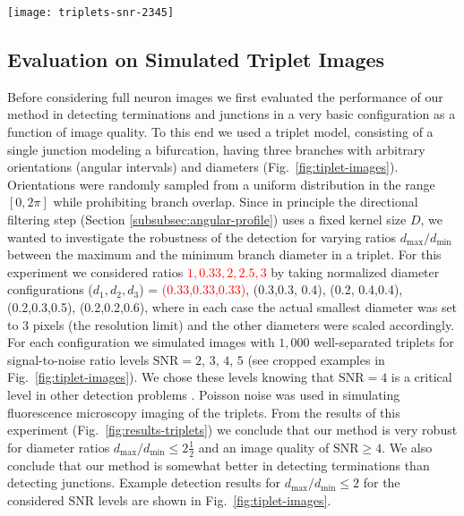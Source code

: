 \documentclass[twocolumn,natbib]{svjour3}
\newcommand{\marked}[1]{\textcolor{red}{#1}}
\begin{document}
\begin{figure*}[!t]
\centering
\texttt{[image: triplets-snr-2345]}
\caption{Examples of simulated triplet images and detection results. Each triplet consists of three branches with different diameters which join at one end to form a bifurcation point and with the other ends being termination points. Images were generated at $\textrm{SNR}=2,3,4,5$ (left to right panel). The detection results with our method are indicated as red circles (bifurcation points) and yellow circles (termination points), where the radius of each circle reflects the size of the critical region found by our method.} %
\label{fig:tiplet-images}
\end{figure*}

\subsection{Evaluation on Simulated Triplet Images}
\label{subsec:experiments-triplets}
Before considering full neuron images we first evaluated the performance of our method in detecting terminations and junctions in a very basic configuration as a function of image quality. To this end we used a triplet model, consisting of a single junction modeling a bifurcation, having three branches with arbitrary orientations (angular intervals) and diameters (Fig.~\ref{fig:tiplet-images}). Orientations were randomly sampled from a uniform distribution in the range $[0,2\pi]$ while prohibiting branch overlap. Since in principle the directional filtering step (Section \ref{subsubsec:angular-profile}) uses a fixed kernel size $D$, we wanted to investigate the robustness of the detection for varying ratios $d_{\max}/d_{\min}$ between the maximum and the minimum branch diameter in a triplet. For this experiment we considered ratios \marked{$1,0.33,2,2.5,3$} by taking normalized diameter configurations ($d_1,d_2,d_3$) = \marked{(0.33,0.33,0.33)}, (0.3,0.3, 0.4), (0.2, 0.4,0.4), (0.2,0.3,0.5), (0.2,0.2,0.6), where in each case the actual smallest diameter was set to 3 pixels (the resolution limit) and the other diameters were scaled accordingly. For each configuration we simulated images with $1,000$ well-separated triplets for signal-to-noise ratio levels $\textrm{SNR}=2$, $3$, $4$, $5$ (see cropped examples in Fig.~\ref{fig:tiplet-images}). We chose these levels knowing that $\textrm{SNR}=4$ is a critical level in other detection problems \citep{smal2010quantitative,Chenouard-2014}. Poisson noise was used in simulating fluorescence microscopy imaging of the triplets. From the results of this experiment (Fig.~\ref{fig:results-triplets}) we conclude that our method is very robust for diameter ratios $d_{\max}/d_{\min}\leq2\frac{1}{2}$ and an image quality of $\textrm{SNR}\geq4$. We also conclude that our method is somewhat better in detecting terminations than detecting junctions. Example detection results for $d_{\max}/d_{\min}\leq2$ for the considered SNR levels are shown in Fig.~\ref{fig:tiplet-images}.
\end{document}
